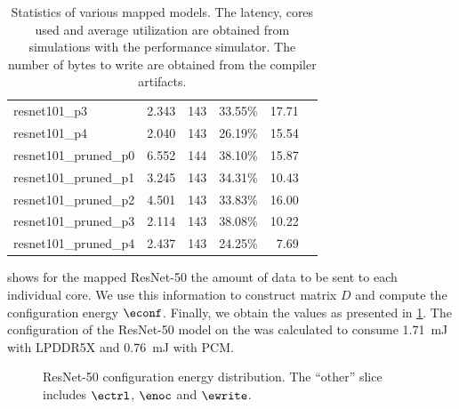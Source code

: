 \begin{table}[hbtp]
\begin{tabular}{@{}lrrrrr@{}}
resnet101\_p3           & 2.343                                                           & 143            & 33.55\%            & 17.71                                                             \\
resnet101\_p4           & 2.040                                                           & 143            & 26.19\%            & 15.54                                                             \\
resnet101\_pruned\_p0   & 6.552                                                           & 144            & 38.10\%            & 15.87                                                             \\
resnet101\_pruned\_p1   & 3.245                                                           & 143            & 34.31\%            & 10.43                                                             \\
resnet101\_pruned\_p2   & 4.501                                                           & 143            & 33.83\%            & 16.00                                                             \\
resnet101\_pruned\_p3   & 2.114                                                           & 143            & 38.08\%            & 10.22                                                             \\
resnet101\_pruned\_p4   & 2.437                                                           & 143            & 24.25\%            & 7.69                                                              \\
\bottomrule
\end{tabular}
\caption{
    Statistics of various mapped models.
    The latency, cores used and average utilization are obtained from simulations with the performance simulator.
    The number of bytes to write are obtained from the compiler artifacts.
}
\label{tab:example_models_stats}
\end{table}

 shows for the mapped ResNet-50 the amount of data to be sent to each individual core.
We use this information to construct matrix $D$ and compute the configuration energy $\econf$.
Finally, we obtain the values as presented in \cref{fig:resnet50_conf_energy_distribution}.
The configuration of the ResNet-50 model on the \graicore{} was calculated to consume \SI{1.71}{mJ} with LPDDR5X and \SI{0.76}{mJ} with PCM.

\begin{figure}[hbtp]
    \centering
    \hfill
    \caption{ResNet-50 configuration energy distribution. The ``other'' slice includes $\ectrl$, $\enoc$ and $\ewrite$.}
    \label{fig:resnet50_conf_energy_distribution}
\end{figure}

